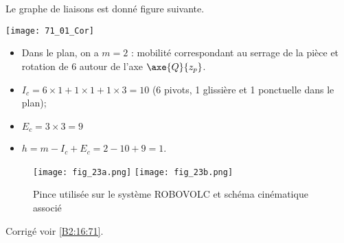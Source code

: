 \normaltrue \difficilefalse \tdifficilefalse
\correctiontrue

\exer{ $\star$ \label{B2:16:71}}
\setcounter{question}{0}


\ifcorrection
\else
{}
\fi


\ifprof
Le graphe de liaisons est donné figure suivante. 

\begin{center}
\texttt{[image: 71\_01\_Cor]}
\end{center}
\begin{itemize}
\item Dans le plan, on a $m=2$ : mobilité correspondant au serrage de la pièce et rotation de 6 autour de l'axe $\axe{Q}{z_p}$.
\item $I_c = 6\times 1 + 1 \times 1 + 1 \times 3 = 10$ (6 pivots, 1 glissière et 1 ponctuelle dans le plan);
\item $E_c = 3 \times 3 = 9$
\item $h=m-I_c+E_c = 2-10+9 = 1$. 
\end{itemize}
\else
\fi

\ifprof
\else
\begin{figure}[H]
\centering
\texttt{[image: fig\_23a.png]}
\texttt{[image: fig\_23b.png]}
\caption{Pince utilisée sur le système ROBOVOLC et schéma cinématique associé \label{fig_23}}
\end{figure} 
\fi 

\ifprof
\else

\noindent\footnotesize
\normalsize

\begin{flushright}
\footnotesize{Corrigé  voir \ref{B2:16:71}.}
\end{flushright}%
\fi